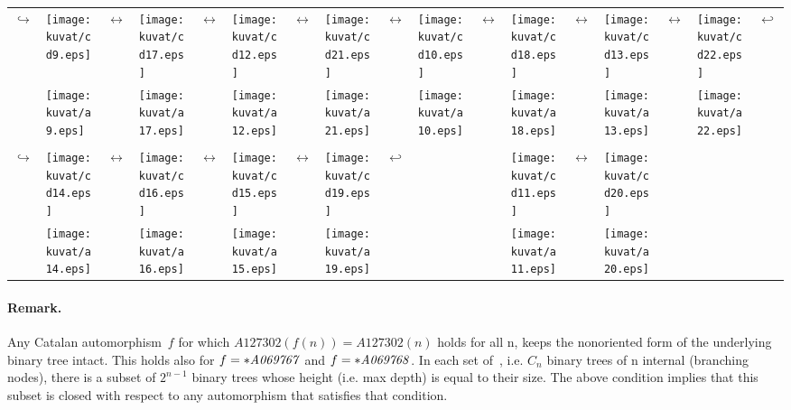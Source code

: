 \documentclass[11pt]{article} %
\newcommand{\autname}[1]{{\it *#1}}
\newcommand{\autletter}[1]{$#1$}
\newcommand{\automorphismlet}[1]{automorphism~\autletter{#1}}
\begin{document}
\begin{center}

\begin{tabular}{>{\small}p{0.07cm} p{0.4cm} >{\small}p{0.07cm} p{0.4cm} >{\small}p{0.07cm} p{0.4cm} >{\small}p{0.07cm} p{0.4cm} >{\small}p{0.07cm} 
p{0.4cm} >{\small}p{0.07cm} p{0.4cm} >{\small}p{0.07cm} p{0.4cm}
>{\small}p{0.07cm} p{0.4cm} >{\small}p{0.07cm}}
$\hookrightarrow$& \texttt{[image: kuvat/cd9.eps]} &$\leftrightarrow$& \texttt{[image: kuvat/cd17.eps]} &$\leftrightarrow$&
 \texttt{[image: kuvat/cd12.eps]} &$\leftrightarrow$& \texttt{[image: kuvat/cd21.eps]} &$\leftrightarrow$&
 \texttt{[image: kuvat/cd10.eps]} &$\leftrightarrow$& \texttt{[image: kuvat/cd18.eps]} &$\leftrightarrow$&
 \texttt{[image: kuvat/cd13.eps]} &$\leftrightarrow$& \texttt{[image: kuvat/cd22.eps]}& $\hookleftarrow$ \\
& \texttt{[image: kuvat/a9.eps]} & & \texttt{[image: kuvat/a17.eps]} & &
 \texttt{[image: kuvat/a12.eps]} & & \texttt{[image: kuvat/a21.eps]} & &
 \texttt{[image: kuvat/a10.eps]} & & \texttt{[image: kuvat/a18.eps]} & &
 \texttt{[image: kuvat/a13.eps]} & & \texttt{[image: kuvat/a22.eps]} & \\

 \\
$\hookrightarrow$& \texttt{[image: kuvat/cd14.eps]} &$\leftrightarrow$& \texttt{[image: kuvat/cd16.eps]} &$\leftrightarrow$&
 \texttt{[image: kuvat/cd15.eps]} &$\leftrightarrow$& \texttt{[image: kuvat/cd19.eps]} &$\hookleftarrow$&
 & &
 \texttt{[image: kuvat/cd11.eps]} & $\leftrightarrow$ & \texttt{[image: kuvat/cd20.eps]} & & & \\
& \texttt{[image: kuvat/a14.eps]} & & \texttt{[image: kuvat/a16.eps]} & &
 \texttt{[image: kuvat/a15.eps]} & & \texttt{[image: kuvat/a19.eps]} & &
 & &
 \texttt{[image: kuvat/a11.eps]} & & \texttt{[image: kuvat/a20.eps]} & & & \\
\end{tabular}
\end{center}


\paragraph{Remark.}
Any Catalan \automorphismlet{f} for which $A127302(f(n)) = A127302(n)$ holds for all n,
keeps the nonoriented form of the underlying binary tree intact.
This holds also for $f = \autname{A069767}$ and  $f = \autname{A069768}$.
In each set of~{\CatsetN}, i.e. $C_n$ binary trees of n internal (branching nodes),
there is a subset of $2^{n-1}$ binary trees whose height (i.e. max depth) is equal
to their size. The above condition implies that this subset is closed with respect
to any automorphism that satisfies that condition.
\end{document}
